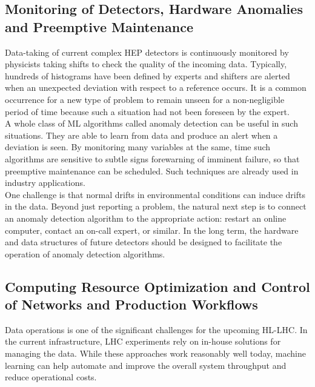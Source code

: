 \subsection{Monitoring of Detectors, Hardware Anomalies and Preemptive Maintenance}\label{sec:applications-monitoring}
Data-taking of current complex HEP detectors is continuously monitored by physicists taking shifts to check the quality of the incoming data. Typically, hundreds of histograms have been defined by experts and shifters are alerted when an unexpected deviation with respect to a reference occurs. It is a common occurrence for a new type of problem to remain unseen for a non-negligible period of time because such a situation had not been foreseen by the expert.\\

A whole class of ML algorithms called anomaly detection can be useful in such situations. They are able to learn from data and produce an alert when a deviation is seen. By monitoring many variables at the same, time such algorithms are sensitive to subtle signs forewarning of imminent failure, so that preemptive maintenance can be scheduled. Such techniques are already used in industry applications.\\

One challenge is that normal drifts in environmental conditions can induce drifts in the data. Beyond just reporting a problem, the natural next step is to connect an anomaly detection algorithm to the appropriate action: restart an online computer, contact an on-call expert, or similar. In the long term, the hardware and data structures of future detectors should be designed to facilitate the operation of anomaly detection algorithms.

\subsection{Computing Resource Optimization and Control of Networks and Production Workflows}\label{sec:resource-optimization}

Data operations is one of the significant challenges for the upcoming HL-LHC. In the current infrastructure, LHC experiments rely on in-house solutions for managing the data. While these approaches work reasonably well today, machine learning can help automate and improve the overall system throughput and reduce operational costs.\\


